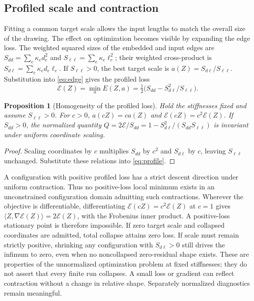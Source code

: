 \documentclass[11pt]{article}
\newtheorem{proposition}{Proposition}
\newcommand{\E}{\mathcal E}
\begin{document}
\subsection{Profiled scale and contraction}
Fitting a common target scale allows the input lengths to match the overall
size of the drawing. The effect on optimization becomes visible by expanding
the edge loss. The weighted squared sizes of the embedded and input edges are
$S_{dd}=\sum_e\kappa_ed_e^2$ and $S_{\ell\ell}=\sum_e\kappa_e\ell_e^2$; their
weighted cross-product is $S_{d\ell}=\sum_e\kappa_ed_e\ell_e$. If
$S_{\ell\ell}>0$, the best target scale is $a(Z)=S_{d\ell}/S_{\ell\ell}$. Substitution into \eqref{eq:edge} gives the profiled loss
\begin{equation}
 \E(Z)=\min_a E(Z,a)=\tfrac12\bigl(S_{dd}-S_{d\ell}^2/S_{\ell\ell}\bigr).
 \label{eq:profile}
\end{equation}
\begin{proposition}[Homogeneity of the profiled loss]\label{prop:scale}
Hold the stiffnesses fixed and assume $S_{\ell\ell}>0$.
For $c>0$, $a(cZ)=ca(Z)$ and $\E(cZ)=c^2\E(Z)$.
If $S_{dd}>0$, the normalized quantity
$Q=2\E/S_{dd}=1-S_{d\ell}^2/(S_{dd}S_{\ell\ell})$ is invariant under
uniform coordinate scaling.
\end{proposition}
\begin{proof}
Scaling coordinates by $c$ multiplies $S_{dd}$ by $c^2$ and $S_{d\ell}$ by $c$,
leaving $S_{\ell\ell}$ unchanged. Substitute these relations into \eqref{eq:profile}.
\end{proof}
A configuration with positive profiled loss has a strict descent direction
under uniform contraction. Thus no positive-loss local minimum exists in an
unconstrained configuration domain admitting such contractions. Wherever the
objective is differentiable, differentiating $\E(cZ)=c^2\E(Z)$ at $c=1$ gives
$\langle Z,\nabla\E(Z)\rangle=2\E(Z)$, with the Frobenius inner product.
A positive-loss stationary point is therefore impossible. If zero target
scale and collapsed coordinates are admitted, total collapse attains zero
loss. If scale must remain strictly positive, shrinking any configuration with
$S_{d\ell}>0$ still drives the infimum to zero, even when no noncollapsed zero-residual
shape exists. These are properties of the unnormalized optimization problem
at fixed stiffnesses; they do not assert that every finite run collapses.
A small loss or gradient can reflect contraction without a change in relative
shape. Separately normalized diagnostics remain meaningful.
\end{document}
